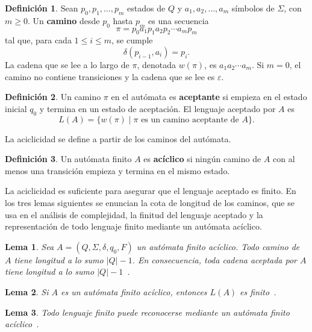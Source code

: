 \documentclass{report}
\theoremstyle{definition}
\newtheorem{definicion}{Definición}[chapter]
\theoremstyle{plain}
\newtheorem{lema}{Lema}[chapter]
\theoremstyle{remark}
\begin{document}
\begin{definicion}
  Sean $p_0,p_1,\ldots,p_m$ estados de $Q$ y $a_1,a_2,\ldots,a_m$
  símbolos de $\Sigma$, con $m \ge 0$. Un \textbf{camino} desde $p_0$
  hasta $p_m$ es una secuencia
  \[
    \pi = p_0 a_1 p_1 a_2 p_2 \cdots a_m p_m
  \]
  tal que, para cada $1 \le i \le m$, se cumple
  \[
    \delta(p_{i-1},a_i)=p_i.
  \]
  La cadena que se lee a lo largo de $\pi$, denotada $w(\pi)$, es
  $a_1a_2\cdots a_m$. Si $m=0$, el camino no contiene transiciones y la
  cadena que se lee es $\varepsilon$.
\end{definicion}

\begin{definicion}
  Un camino $\pi$ en el autómata es \textbf{aceptante} si empieza en el
  estado inicial $q_0$ y termina en un estado de aceptación. El lenguaje
  aceptado por $A$ es
  \[
    L(A) =
    \{w(\pi) \mid \pi
    \text{ es un camino aceptante de } A\}.
  \]
\end{definicion}

La aciclicidad se define a partir de los caminos del autómata.

\begin{definicion}
  Un autómata finito $A$ es \textbf{acíclico} si
  ningún camino de $A$ con al menos una transición empieza y termina en
  el mismo estado.
\end{definicion}

La aciclicidad es suficiente para asegurar que el lenguaje aceptado es
finito. En los tres lemas siguientes se enuncian la cota de longitud de
los caminos, que se usa en el análisis de complejidad, la finitud del
lenguaje aceptado y la representación de todo lenguaje finito mediante
un autómata acíclico.

\begin{lema}
  \label{lema:longitud-caminos-aciclicos}
  Sea $A=(Q,\Sigma,\delta,q_0,F)$ un autómata finito acíclico. Todo
  camino de $A$ tiene longitud a lo sumo $|Q|-1$. En
  consecuencia, toda cadena aceptada por $A$ tiene longitud a lo sumo
  $|Q|-1$~\cite{bertsch2001rcg}.
\end{lema}

\begin{lema}
  \label{lema:lenguaje-finito-aciclico}
  Si $A$ es un autómata finito acíclico, entonces
  $L(A)$ es finito~\cite{bertsch2001rcg}.
\end{lema}

\begin{lema}
  \label{lema:finito-reconocible-aciclico}
  Todo lenguaje finito puede reconocerse mediante un autómata finito
  acíclico~\cite{bertsch2001rcg}.
\end{lema}
\end{document}
